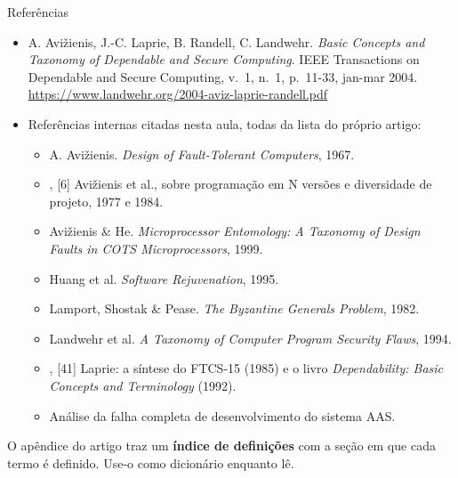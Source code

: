 \documentclass{beamer}
\newcommand{\Avz}{Avi\v{z}ienis}
\begin{document}
\begin{frame}{Refer\^encias}
    \footnotesize
    \begin{itemize}
        \item A. \Avz{}, J.-C. Laprie, B. Randell, C. Landwehr. \textit{Basic Concepts and Taxonomy of Dependable and Secure Computing}. IEEE Transactions on Dependable and Secure Computing, v.\ 1, n.\ 1, p.\ 11-33, jan-mar 2004.\\
        {\scriptsize \url{https://www.landwehr.org/2004-aviz-laprie-randell.pdf}}
        \medskip
        \item Refer\^encias internas citadas nesta aula, todas da lista do pr\'oprio artigo:
        \begin{itemize}
            \scriptsize
            \item [3] A. \Avz. \textit{Design of Fault-Tolerant Computers}, 1967.
            \item [4], [6] \Avz{} et al., sobre programa\c{c}\~ao em N vers\~oes e diversidade de projeto, 1977 e 1984.
            \item [5] \Avz{} \& He. \textit{Microprocessor Entomology: A Taxonomy of Design Faults in COTS Microprocessors}, 1999.
            \item [27] Huang et al. \textit{Software Rejuvenation}, 1995.
            \item [38] Lamport, Shostak \& Pease. \textit{The Byzantine Generals Problem}, 1982.
            \item [39] Landwehr et al. \textit{A Taxonomy of Computer Program Security Flaws}, 1994.
            \item [40], [41] Laprie: a s\'intese do FTCS-15 (1985) e o livro \textit{Dependability: Basic Concepts and Terminology} (1992).
            \item [67] An\'alise da falha completa de desenvolvimento do sistema AAS.
        \end{itemize}
    \end{itemize}
    \medskip
    \begin{ancora}
        \scriptsize
        O ap\^endice do artigo traz um \textbf{\'indice de defini\c{c}\~oes} com a se\c{c}\~ao em que cada termo \'e definido. Use-o como dicion\'ario enquanto l\^e.
    \end{ancora}
\end{frame}
\end{document}
